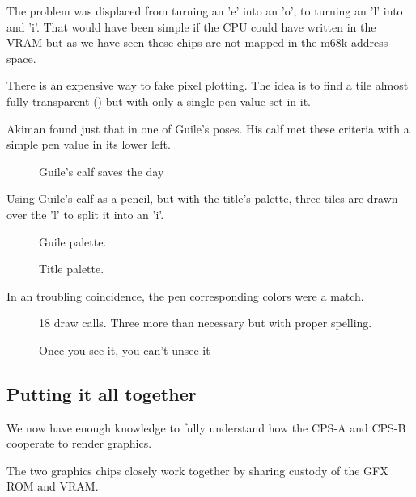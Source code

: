 The problem was displaced from turning an 'e' into an 'o', to turning an 'l' into and 'i'. That would have been simple if the CPU could have written in the VRAM but as we have seen these chips are not mapped in the m68k address space.

There is an expensive way to fake pixel plotting. The idea is to find a tile almost fully transparent () but with only a single pen value set in it. 

Akiman found just that in one of Guile's poses. His calf met these criteria with a simple pen value in its lower left.

\begin{figure}[H]
\caption*{Guile's calf saves the day}%
 \end{figure}%

Using Guile's calf as a pencil, but with the title's palette, three tiles are drawn over the 'l' to split it into an 'i'.

\begin{figure}[H]
 \caption*{Guile palette.}%
 \end{figure}%

 \begin{figure}[H]
 \caption*{Title palette.}%
 \end{figure}%


 In an troubling coincidence, the pen corresponding colors were a match.

\begin{figure}[H]
 \caption*{18 draw calls. Three more than necessary but with proper spelling.}%
 \end{figure}%

\begin{figure}[H]
 \caption*{Once you see it, you can't unsee it}%
 \end{figure}%



\subsection{Putting it all together}

We now have enough knowledge to fully understand how the CPS-A and CPS-B cooperate to render graphics.

The two graphics chips closely work together by sharing custody of the GFX ROM and VRAM. 



